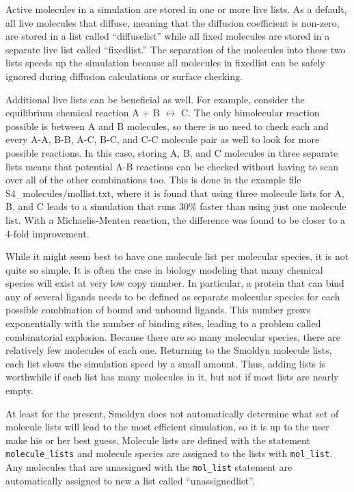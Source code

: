 \documentclass {scrbook}
\newcommand {\ttt} {\texttt}
\begin{document}
Active molecules in a simulation are stored in one or more live lists. As a default, all live molecules that diffuse, meaning that the diffusion coefficient is non-zero, are stored in a list called ``diffuselist'' while all fixed molecules are stored in a separate live list called ``fixedlist.'' The separation of the molecules into these two lists speeds up the simulation because all molecules in fixedlist can be safely ignored during diffusion calculations or surface checking.

Additional live lists can be beneficial as well. For example, consider the equilibrium chemical reaction A + B $\leftrightarrow$ C. The only bimolecular reaction possible is between A and B molecules, so there is no need to check each and every A-A, B-B, A-C, B-C, and C-C molecule pair as well to look for more possible reactions. In this case, storing A, B, and C molecules in three separate lists means that potential A-B reactions can be checked without having to scan over all of the other combinations too. This is done in the example file S4\_molecules/mollist.txt, where it is found that using three molecule lists for A, B, and C leads to a simulation that runs 30\% faster than using just one molecule list. With a Michaelis-Menten reaction, the difference was found to be closer to a 4-fold improvement.

While it might seem best to have one molecule list per molecular species, it is not quite so simple. It is often the case in biology modeling that many chemical species will exist at very low copy number. In particular, a protein that can bind any of several ligands needs to be defined as separate molecular species for each possible combination of bound and unbound ligands. This number grows exponentially with the number of binding sites, leading to a problem called combinatorial explosion. Because there are so many molecular species, there are relatively few molecules of each one. Returning to the Smoldyn molecule lists, each list slows the simulation speed by a small amount. Thus, adding lists is worthwhile if each list has many molecules in it, but not if most lists are nearly empty.

At least for the present, Smoldyn does not automatically determine what set of molecule lists will lead to the most efficient simulation, so it is up to the user make his or her best guess. Molecule lists are defined with the statement \ttt{molecule\_lists} and molecule species are assigned to the lists with \ttt{mol\_list}. Any molecules that are unassigned with the \ttt{mol\_list} statement are automatically assigned to new a list called ``unassignedlist''.
\end{document}
